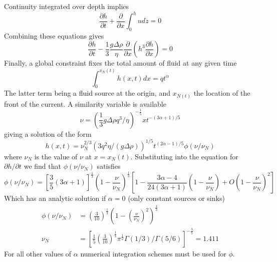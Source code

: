 \documentclass[10pt]{article}
\begin{document}
		Continuity integrated over depth implies
			\begin{equation}
				\frac{\partial h}{\partial t} + \frac{\partial }{\partial x} \int_0^h u dz = 0
			\end{equation}
		Combining these equations gives
			\begin{equation}
				\frac{\partial h}{\partial t} -\frac{1}{3} \frac{g \Delta \rho}{\eta} 
				     \frac{\partial }{\partial x}  \left( h^3 \frac{\partial h}{\partial x} \right) = 0 
			\end{equation}
	   Finally, a global constraint fixes the total amount of fluid at any given time
		   	\begin{equation}
		   		\int_0^{x_N(t)} h(x,t)dx = qt^\alpha
		   	\end{equation}		
	 The latter term being a fluid source at the origin, and $x_{N(t)}$ the 
	 location of the front of the current.
	 A similarity variable is available
	 	\begin{equation}
	 		\nu = \left( \frac{1}{3} g\Delta \rho q^3 / \eta \right)^{-\frac{1}{5}} x t^{-(3\alpha +1) / 5}
	 	\end{equation}
	giving a solution of the form
		\begin{equation}
			h(x,t) = \nu_N^{2/3} (3q^2 \eta / (g\Delta\rho))^{1/5} t^{(2\alpha -1) / 5} \phi(\nu/\nu_N)
		\end{equation}
	where $\nu_N$ is the value of $\nu$ at $x=x_N(t)$. Substituting into the equation
	for $\partial h / \partial t$ we find that $\phi(\nu/\nu_N)$ satisfies
		\begin{equation}
			\phi({\nu}/{\nu_N}) = \left[ \frac{3}{5}(3\alpha+1)\right]^{\frac{1}{3}}
				\left(1-\frac{\nu}{\nu_N} \right)^{\frac{1}{3}} \left[
				1 - \frac{3\alpha-4}{24(3\alpha+1)}\left(1-\frac{\nu}{\nu_N} \right) + O \left(1-\frac{\nu}{\nu_N} \right)^2
				\right]
		\end{equation}
	Which has an analytic solution if $\alpha=0$ (only constant sources or sinks)
		\begin{equation}
			\begin{split} 
			\phi({\nu}/{\nu_N}) &= \left( \frac{3}{10}\right)^{\frac{1}{3}} 
			\left( 1-\left(\frac{\nu}{\nu_N}\right)^2 \right)^{\frac{1}{3}}  \\						
		\nu_N &= \left[ \frac{1}{5} \left( \frac{3}{10}\right)^{\frac{1}{3}}  \pi^{\frac{1}{2}}
	\Gamma (1/3) / \Gamma (5/6) \right]^{-\frac{3}{5}} = 1.411
			\end{split}
		\end{equation}
	For all other values of $\alpha$ numerical integration schemes must be 
	used for $\phi$.
\end{document}

